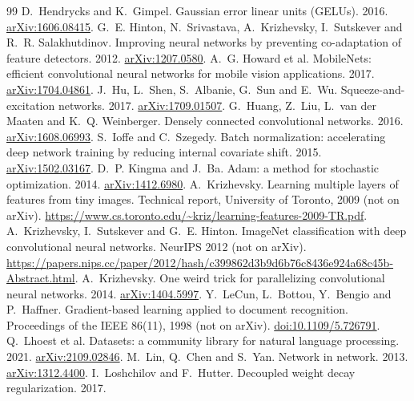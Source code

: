 \documentclass[11pt,a4paper]{article}
\begin{document}
\begin{thebibliography}{99}
 D.~Hendrycks and K.~Gimpel. Gaussian error linear units (GELUs). 2016.
  \href{https://arxiv.org/abs/1606.08415}{arXiv:1606.08415}.
 G.~E. Hinton, N.~Srivastava, A.~Krizhevsky, I.~Sutskever and R.~R. Salakhutdinov. Improving neural networks
  by preventing co-adaptation of feature detectors. 2012. \href{https://arxiv.org/abs/1207.0580}{arXiv:1207.0580}.
 A.~G. Howard et al. MobileNets: efficient convolutional neural networks for mobile vision applications.
  2017. \href{https://arxiv.org/abs/1704.04861}{arXiv:1704.04861}.
 J.~Hu, L.~Shen, S.~Albanie, G.~Sun and E.~Wu. Squeeze-and-excitation networks. 2017.
  \href{https://arxiv.org/abs/1709.01507}{arXiv:1709.01507}.
 G.~Huang, Z.~Liu, L.~van der Maaten and K.~Q. Weinberger. Densely connected convolutional networks. 2016.
  \href{https://arxiv.org/abs/1608.06993}{arXiv:1608.06993}.
 S.~Ioffe and C.~Szegedy. Batch normalization: accelerating deep network training by reducing internal
  covariate shift. 2015. \href{https://arxiv.org/abs/1502.03167}{arXiv:1502.03167}.
 D.~P. Kingma and J.~Ba. Adam: a method for stochastic optimization. 2014.
  \href{https://arxiv.org/abs/1412.6980}{arXiv:1412.6980}.
 A.~Krizhevsky. Learning multiple layers of features from tiny images. Technical report, University of
  Toronto, 2009 (not on arXiv). \url{https://www.cs.toronto.edu/~kriz/learning-features-2009-TR.pdf}.
 A.~Krizhevsky, I.~Sutskever and G.~E. Hinton. ImageNet classification with deep convolutional neural
  networks. NeurIPS 2012 (not on arXiv).
  \url{https://papers.nips.cc/paper/2012/hash/c399862d3b9d6b76c8436e924a68c45b-Abstract.html}.
 A.~Krizhevsky. One weird trick for parallelizing convolutional neural networks. 2014.
  \href{https://arxiv.org/abs/1404.5997}{arXiv:1404.5997}.
 Y.~LeCun, L.~Bottou, Y.~Bengio and P.~Haffner. Gradient-based learning applied to document recognition.
  Proceedings of the IEEE 86(11), 1998 (not on arXiv). \href{https://doi.org/10.1109/5.726791}{doi:10.1109/5.726791}.
 Q.~Lhoest et al. Datasets: a community library for natural language processing. 2021.
  \href{https://arxiv.org/abs/2109.02846}{arXiv:2109.02846}.
 M.~Lin, Q.~Chen and S.~Yan. Network in network. 2013.
  \href{https://arxiv.org/abs/1312.4400}{arXiv:1312.4400}.
 I.~Loshchilov and F.~Hutter. Decoupled weight decay regularization. 2017.

\end{thebibliography}
\end{document}

